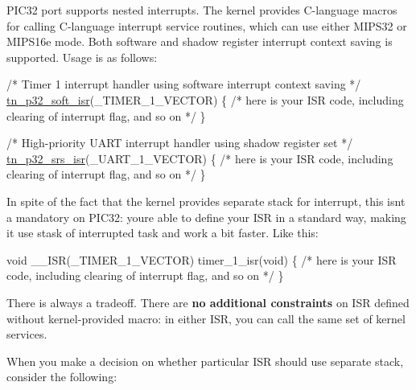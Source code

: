 P\+I\+C32 port supports nested interrupts. The kernel provides C-\/language macros for calling C-\/language interrupt service routines, which can use either M\+I\+P\+S32 or M\+I\+P\+S16e mode. Both software and shadow register interrupt context saving is supported. Usage is as follows\+:


\begin{DoxyCode}
\textcolor{comment}{/* Timer 1 interrupt handler using software interrupt context saving */}
\hyperlink{tn__arch__pic32_8h_a02d853d8d573f928fb8da65ef0c2bc8e}{tn\_p32\_soft\_isr}(\_TIMER\_1\_VECTOR)
\{
   \textcolor{comment}{/* here is your ISR code, including clearing of interrupt flag, and so on */}
\}

\textcolor{comment}{/* High-priority UART interrupt handler using shadow register set */}
\hyperlink{tn__arch__pic32_8h_a523bb667617e6bb6f68a8f85855030a5}{tn\_p32\_srs\_isr}(\_UART\_1\_VECTOR)
\{
   \textcolor{comment}{/* here is your ISR code, including clearing of interrupt flag, and so on */}
\}
\end{DoxyCode}


In spite of the fact that the kernel provides separate stack for interrupt, this isn\textquotesingle{}t a mandatory on P\+I\+C32\+: you\textquotesingle{}re able to define your I\+SR in a standard way, making it use stask of interrupted task and work a bit faster. Like this\+:


\begin{DoxyCode}
\textcolor{keywordtype}{void} \_\_ISR(\_TIMER\_1\_VECTOR) timer\_1\_isr(\textcolor{keywordtype}{void})
\{
   \textcolor{comment}{/* here is your ISR code, including clearing of interrupt flag, and so on */}
\}
\end{DoxyCode}


There is always a tradeoff. There are {\bfseries no additional constraints} on I\+SR defined without kernel-\/provided macro\+: in either I\+SR, you can call the same set of kernel services.

When you make a decision on whether particular I\+SR should use separate stack, consider the following\+:


